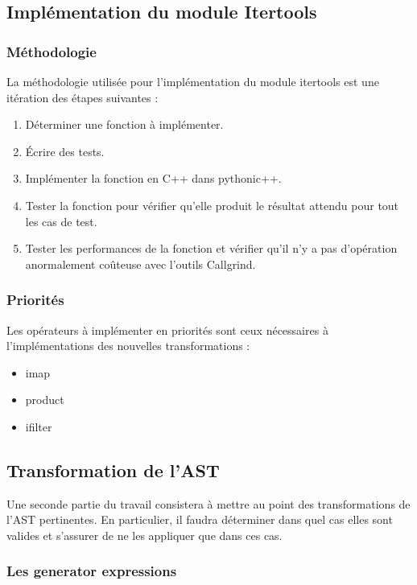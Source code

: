 \documentclass[a4paper]{article}
\begin{document}
\subsection{Implémentation du module Itertools}

\subsubsection{Méthodologie}

La méthodologie utilisée pour l'implémentation du module itertools est une itération des étapes suivantes :

\begin{enumerate}
\item Déterminer une fonction à implémenter.
\item Écrire des tests.
\item Implémenter la fonction en C++ dans pythonic++.
\item Tester la fonction pour vérifier qu'elle produit le résultat attendu pour tout les cas de test.
\item Tester les performances de la fonction et vérifier qu'il n'y a pas d'opération anormalement coûteuse avec l'outils Callgrind. 
\end{enumerate}

\subsubsection{Priorités}

Les opérateurs à implémenter en priorités sont ceux nécessaires à l'implémentations des nouvelles transformations :

\begin{itemize}
  \item imap
  \item product
  \item ifilter
\end{itemize}


\subsection{Transformation de l'AST}

Une seconde partie du travail consistera à mettre au point des transformations de l'AST pertinentes. En particulier, il faudra déterminer dans quel cas elles sont valides et s'assurer de ne les appliquer que dans ces cas.

\subsubsection{Les generator expressions}
\end{document}

